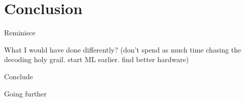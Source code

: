\section{Conclusion}

Reminisce

What I would have done differently? (don't spend as much time chasing the decoding holy grail. start ML earlier. find better hardware)

Conclude

Going further
